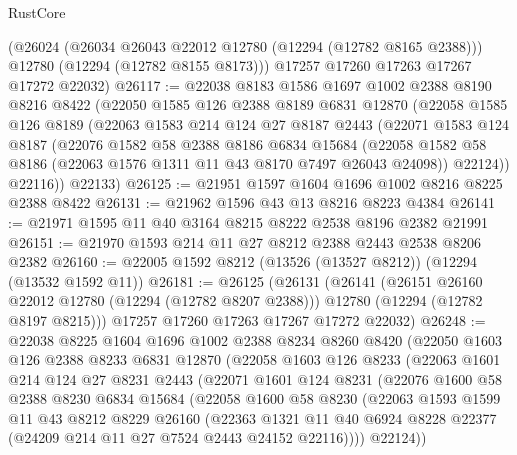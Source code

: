 \begin{lexlean}{RustCore}
\begin{coremodule}
      (@26024
        (@26034 @26043 @22012 @12780 (@12294 (@12782 @8165 @2388)))
        @12780
        (@12294 (@12782 @8155 @8173)))
      @17257
      @17260
      @17263
      @17267
      @17272
      @22032)
@26117 := @22038
    @8183
    @1586
    @1697
    @1002
    @2388
    @8190
    @8216
    @8422
    (@22050
      @1585
      @126
      @2388
      @8189
      @6831
      @12870
      (@22058
        @1585
        @126
        @8189
        (@22063
          @1583
          @214
          @124
          @27
          @8187
          @2443
          (@22071
            @1583
            @124
            @8187
            (@22076
              @1582
              @58
              @2388
              @8186
              @6834
              @15684
              (@22058 @1582 @58 @8186 (@22063 @1576 @1311 @11 @43 @8170 @7497 @26043 @24098))
              @22124))
          @22116))
      @22133)
@26125 := @21951 @1597 @1604 @1696 @1002 @8216 @8225 @2388 @8422
@26131 := @21962 @1596 @43 @13 @8216 @8223 @4384
@26141 := @21971 @1595 @11 @40 @3164 @8215 @8222 @2538 @8196 @2382 @21991
@26151 := @21970 @1593 @214 @11 @27 @8212 @2388 @2443 @2538 @8206 @2382
@26160 := @22005 @1592 @8212 (@13526 (@13527 @8212)) (@12294 (@13532 @1592 @11))
@26181 := @26125
    (@26131
      (@26141
        (@26151 @26160 @22012 @12780 (@12294 (@12782 @8207 @2388)))
        @12780
        (@12294 (@12782 @8197 @8215)))
      @17257
      @17260
      @17263
      @17267
      @17272
      @22032)
@26248 := @22038
    @8225
    @1604
    @1696
    @1002
    @2388
    @8234
    @8260
    @8420
    (@22050
      @1603
      @126
      @2388
      @8233
      @6831
      @12870
      (@22058
        @1603
        @126
        @8233
        (@22063
          @1601
          @214
          @124
          @27
          @8231
          @2443
          (@22071
            @1601
            @124
            @8231
            (@22076
              @1600
              @58
              @2388
              @8230
              @6834
              @15684
              (@22058
                @1600
                @58
                @8230
                (@22063
                  @1593
                  @1599
                  @11
                  @43
                  @8212
                  @8229
                  @26160
                  (@22363
                    @1321
                    @11
                    @40
                    @6924
                    @8228
                    @22377
                    (@24209 @214 @11 @27 @7524 @2443 @24152 @22116))))
              @22124))

\end{coremodule}
\end{lexlean}
